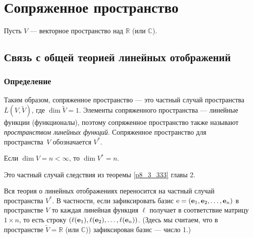\chapter{Сопряженное пространство%
}\label{lin_funk}

Пусть $V$ --- векторное пространство над $\mathbb{R}$ (или $\mathbb{C}$).



\section{Связь с общей теорией линейных отображений}

\subsection{Определение}


Таким образом, сопряженное пространство --- это частный случай пространства  $\overline{L}(V, \widetilde{V})$, где   $\dim \widetilde{V} = 1$.
Элементы сопряженного пространства --- линейные функции (функционалы), поэтому сопряженное пространство также называют 
{\it пространством линейных функций}. Сопряженное пространство для пространства~$V$ обозначается $V^{*}$.

\begin{predl}\label{p8_4_111}
Если $\dim V = n< \infty$, то $\dim V^{*} = n$.
\end{predl}
\dok Это частный случай следствия из теоремы \ref{p8_3_333} главы 2.
\edok

\otstup

Вся теория о линейных отображениях переносится на частный случай пространства $V^*$.
В частности, если зафиксировать базис $\mathrm{e} = (\mathbf{e}_1, \mathbf{e}_2, \ldots , \mathbf{e}_n)$ 
в пространстве $V$ 
то каждая линейная функция $\ell$ получает в соответствие матрицу $1\times n$, то есть строку
$(\ell(\mathbf{e}_1), \ell(\mathbf{e}_2), \ldots , \ell(\mathbf{e}_n))$.  
(Здесь мы считаем, что в пространстве $\widetilde{V} = \mathbb{R}$ (или $ \mathbb{C}$)) зафиксирован базис --- число 1.) 


